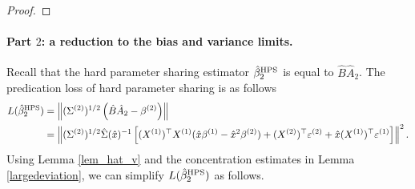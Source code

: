 \begin{proof}
%
\end{proof}

\paragraph{Part $2$: a reduction to the bias and variance limits.}
Recall that the hard parameter sharing estimator $\hat{\beta}_2^{\textup{HPS}}$ is equal to $\hat{B} \hat{A}_2$.
The predication loss of hard parameter sharing is as follows
\begin{align}
L(\hat{\beta}_2^{\textup{HPS}}) &=\left\|(\Sigma^{(2)})^{1/2} \left( \hat B \hat A_2 - \beta^{(2)}\right)\right\| \nonumber\\
&=  \left\| (\Sigma^{(2)})^{1/2}\hat \Sigma(\hat x)^{-1} \left[(X^{(1)})^\top X^{(1)} (\hat x\beta^{(1)}-\hat x^2\beta^{(2)})+ (X^{(2)})^\top \varepsilon^{(2)} + \hat x   (X^{(1)})^\top \varepsilon^{(1)} \right]\right\|^2.\label{Lbeta_HPS}
\end{align}
Using Lemma \ref{lem_hat_v} and the concentration estimates in Lemma \ref{largedeviation}, we can simplify $L(\hat{\beta}_2^{\textup{HPS}})$ as follows.

